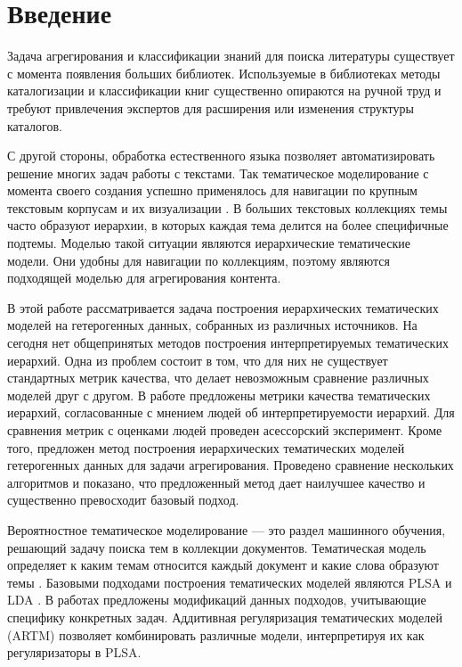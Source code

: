 \chapter{Введение}

Задача агрегирования и классификации знаний для поиска литературы существует с момента появления больших библиотек. Используемые в библиотеках методы каталогизации и классификации книг \cite{Sill2007} существенно опираются на ручной труд и требуют привлечения экспертов для расширения или изменения структуры каталогов.

С другой стороны, обработка естественного языка позволяет автоматизировать решение многих задач работы с текстами. Так тематическое моделирование с момента своего создания успешно применялось для навигации по крупным текстовым корпусам и их визуализации \cite{Blei2007, Chaney2012, Chuang2012}. В больших текстовых коллекциях темы часто образуют иерархии, в которых каждая тема делится на более специфичные подтемы. Моделью такой ситуации являются иерархические тематические модели. Они удобны для навигации по коллекциям, поэтому являются подходящей моделью для агрегирования контента. 

В этой работе рассматривается задача построения иерархических тематических моделей на гетерогенных данных, собранных из различных источников. На сегодня нет общепринятых методов построения интерпретируемых тематических иерархий. Одна из проблем состоит в том, что для них не существует стандартных метрик качества, что делает невозможным сравнение различных моделей друг с другом. В работе предложены метрики качества тематических иерархий, согласованные с мнением людей об интерпретируемости иерархий. Для сравнения метрик с оценками людей проведен асессорский эксперимент. Кроме того, предложен метод построения иерархических тематических моделей гетерогенных данных для задачи агрегирования. Проведено сравнение нескольких алгоритмов и показано, что предложенный метод дает наилучшее качество и существенно превосходит базовый подход. 

Вероятностное тематическое моделирование --- это  раздел машинного обучения, решающий задачу поиска тем в коллекции документов. Тематическая модель определяет к каким темам относится каждый документ и какие слова образуют темы \cite{Blei2012}. Базовыми подходами построения тематических моделей являются PLSA \cite{PLSA} и LDA \cite{LDA}. В работах \cite{extLDA1,extLDA2, extLDA3} предложены модификаций данных подходов, учитывающие специфику конкретных задач. Аддитивная регуляризация тематических
моделей (ARTM) \cite{ARTM1, ARTM2, ARTM3, ARTM4} позволяет комбинировать различные модели, интерпретируя их как регуляризаторы в PLSA. 

